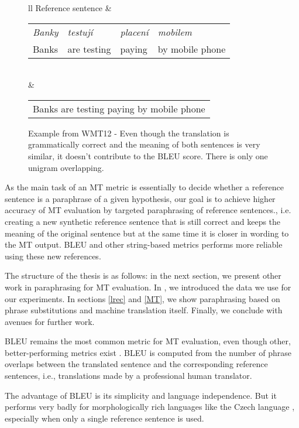 {\begin{figure*}[tb]
\begin{center}
\begin{tabular}{ll}
 \hline
 Reference sentence & \begin{tabular}{llll}
 			\textit{Banky} & \textit{testuj\'i} & \textit{placen\'i} & \textit{mobilem} \\
 			Banks & are testing & paying & by mobile phone \\
			\end{tabular} \\
 &  \begin{tabular}{l}
  	Banks are testing paying by mobile phone \\
	\end{tabular}
 
\end{tabular}
\caption{Example from WMT12 - Even though the translation is grammatically 
correct and the meaning of both sentences is very similar, it doesn't contribute 
to the BLEU score. There is only one unigram overlapping.}
\end{center}
\label{example_of_BLEU_malfunction}
\end{figure*}

As the main task of an MT metric is essentially to decide whether a reference
sentence is a paraphrase of a given hypothesis, our goal is to achieve higher 
accuracy of MT evaluation by targeted paraphrasing of reference sentences., 
i.e. creating a new synthetic reference sentence that is still correct and 
keeps the meaning of the original sentence but at the same time it is closer in 
wording to the MT output. BLEU and other string-based metrics performs more 
reliable using these new references. %

The structure of the thesis is as follows: in the next section, we present 
other work in paraphrasing for MT evaluation. In , we introduced
the data we use for our experiments. In sections \ref{lrec} and \ref{MT}, 
we show paraphrasing based on phrase substitutions and machine translation 
itself. Finally, we conclude with avenues for further work.





BLEU \cite{bleu} remains the most common metric for MT evaluation, even
though other, better-performing metrics exist \cite{wmt13-metrics}. BLEU is 
computed from the number of phrase overlaps between the translated sentence and 
the corresponding reference sentences, i.e., translations made by a professional 
human translator. 

The advantage of BLEU is its simplicity and language independence. But it performs 
very badly for morphologically rich languages %
like the Czech language \cite{bojar-tackling-sparse-data}, especially when only a 
single reference sentence is used.

}

